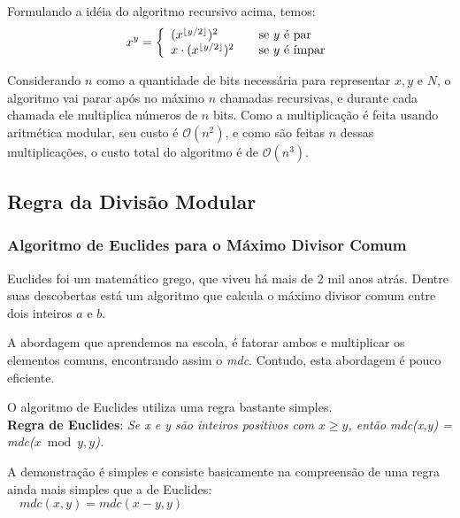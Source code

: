 Formulando a idéia do algoritmo recursivo acima, temos:
\[ x^y =
  \left \{
    \begin{array}{l l}
      (x^{\lfloor y/2 \rfloor})^2 & \quad \textrm{se $y$ é par}\\
      x\cdot(x^{\lfloor y/2 \rfloor})^2 & \quad \textrm{se $y$ é ímpar}
    \end{array}
  \right.
\]

Considerando $n$ como a quantidade de bits necessária para representar $x, y$
e $N$, o algoritmo vai parar após no máximo $n$ chamadas recursivas, e durante
cada chamada ele multiplica números de $n$ bits. Como a multiplicação é feita usando aritmética modular, 
seu custo é $\mathcal{O}(n^2)$, e como são feitas $n$ dessas multiplicações, o
custo total do algoritmo é de $\mathcal{O}(n^3)$.


\vspace{1.5em}
\subsection*{Regra da Divisão Modular}


\vspace{1.3em}
\subsubsection*{Algoritmo de Euclides para o Máximo Divisor Comum}

Euclides foi um matemático grego, que viveu há mais de 2 mil anos atrás.
Dentre suas descobertas está um algoritmo que calcula o máximo divisor comum
entre dois inteiros $a$ e $b$.

A abordagem que aprendemos na escola, é fatorar ambos e multiplicar os
elementos comuns, encontrando assim o \textit{mdc}. Contudo, esta abordagem é
pouco eficiente.

O algoritmo de Euclides utiliza uma regra bastante simples.\\
\textbf{Regra de Euclides}: \textit{Se x e y são inteiros positivos com $x
\geq y$, então mdc(x,y) = mdc($x \bmod y, y$).}

A demonstração é simples e consiste basicamente na compreensão de uma regra
ainda mais simples que a de Euclides:\\

$\quad mdc(x,y) = mdc(x-y, y)$\\

